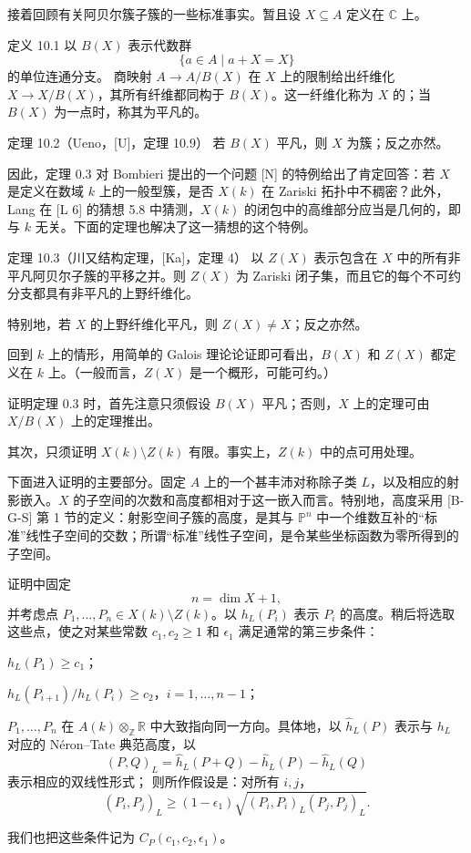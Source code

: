 接着回顾有关阿贝尔簇子簇的一些标准事实。暂且设 $X\subseteq A$ 定义在 $\mathbb C$ 上。
\begin{statement}{定义 10.1}
以 $B(X)$ 表示代数群
\[
\{a\in A\mid a+X=X\}
\]
的单位连通分支。
商映射 $A\to A/B(X)$ 在 $X$ 上的限制给出纤维化 $X\to X/B(X)$，其所有纤维都同构于 $B(X)$。这一纤维化称为 $X$ 的；当 $B(X)$ 为一点时，称其为平凡的。
\end{statement}
\begin{statement}{定理 10.2（Ueno，[U]，定理 10.9）}
若 $B(X)$ 平凡，则 $X$ 为簇；反之亦然。
\end{statement}
因此，定理 0.3 对 Bombieri 提出的一个问题 [N] 的特例给出了肯定回答：若 $X$ 是定义在数域 $k$ 上的一般型簇，是否 $X(k)$ 在 Zariski 拓扑中不稠密？此外，Lang 在 [L 6] 的猜想 5.8 中猜测，$X(k)$ 的闭包中的高维部分应当是几何的，即与 $k$ 无关。下面的定理也解决了这一猜想的这个特例。
\begin{statement}{定理 10.3（川又结构定理，[Ka]，定理 4）}
以 $Z(X)$ 表示包含在 $X$ 中的所有非平凡阿贝尔子簇的平移之并。则 $Z(X)$ 为 Zariski 闭子集，而且它的每个不可约分支都具有非平凡的上野纤维化。
\end{statement}
特别地，若 $X$ 的上野纤维化平凡，则 $Z(X)\ne X$；反之亦然。

回到 $k$ 上的情形，用简单的 Galois 理论论证即可看出，$B(X)$ 和 $Z(X)$ 都定义在 $k$ 上。（一般而言，$Z(X)$ 是一个概形，可能可约。）

证明定理 0.3 时，首先注意只须假设 $B(X)$ 平凡；否则，$X$ 上的定理可由 $X/B(X)$ 上的定理推出。

其次，只须证明 $X(k)\setminus Z(k)$ 有限。事实上，$Z(k)$ 中的点可用处理。

下面进入证明的主要部分。固定 $A$ 上的一个甚丰沛对称除子类 $L$，以及相应的射影嵌入。$X$ 的子空间的次数和高度都相对于这一嵌入而言。特别地，高度采用 [B-G-S] 第 1 节的定义：射影空间子簇的高度，是其与 $\mathbb P^n$ 中一个维数互补的“标准”线性子空间的交数；所谓“标准”线性子空间，是令某些坐标函数为零所得到的子空间。

证明中固定
\[
n=\dim X+1,
\]
并考虑点 $P_1,\ldots,P_n\in X(k)\setminus Z(k)$。以 $h_L(P_i)$ 表示 $P_i$ 的高度。稍后将选取这些点，使之对某些常数 $c_1,c_2\ge1$ 和 $\epsilon_1$ 满足通常的第三步条件：
\begin{description}[style=nextline,leftmargin=5.5em]
\item[(10.4.1).] $h_L(P_1)\ge c_1$；
\item[(10.4.2).] $h_L(P_{i+1})/h_L(P_i)\ge c_2$，$i=1,\ldots,n-1$；
\item[(10.4.3).] $P_1,\ldots,P_n$ 在 $A(k)\otimes_{\mathbb Z}\mathbb R$ 中大致指向同一方向。具体地，以 $\widehat h_L(P)$ 表示与 $h_L$ 对应的 Néron--Tate 典范高度，以
\[
(P,Q)_L=\widehat h_L(P+Q)-\widehat h_L(P)-\widehat h_L(Q)
\]
表示相应的双线性形式；
则所作假设是：对所有 $i,j$，
\[
(P_i,P_j)_L\ge(1-\epsilon_1)\sqrt{(P_i,P_i)_L(P_j,P_j)_L}.
\]
\end{description}
我们也把这些条件记为 $C_P(c_1,c_2,\epsilon_1)$。

